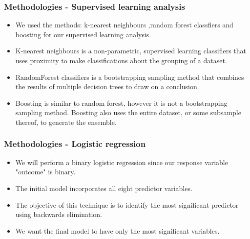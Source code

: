\documentclass{beamer}
\begin{document}
\begin{frame}
\end{frame}

\begin{frame}
    \frametitle{Methodologies - Supervised learning analysis}
        \begin{itemize}
            \setlength\itemsep{1em}
            \item We used the methods: k-nearest neighbours ,random forest classfiers and boosting for our supervised learning analysis.
            \item K-nearest neighbours is a non-parametric, supervised learning classifiers that uses proximity to make classifications about the grouping of a dataset.
            \item RandomForest classifiers is a bootstrapping sampling method that combines the results of multiple decision trees to draw on a conclusion.
            \item Boosting is similar to random forest, however it is not a bootstrapping sampling method. Boosting also uses the entire dataset, or some subsample thereof, to generate the ensemble.
        \end{itemize}
\end{frame}

\begin{frame}
    \frametitle{Methodologies - Logistic regression}
        \begin{itemize}
            \setlength\itemsep{1em}
            \item We will perform a binary logistic regression since our response variable "outcome" is binary.
            \item The initial model incorporates all eight predictor variables.
            \item The objective of this technique is to identify the most significant predictor using backwards elimination.
            \item We want the final model to have only the most significant variables.
        \end{itemize}
\end{frame}

\end{document}
